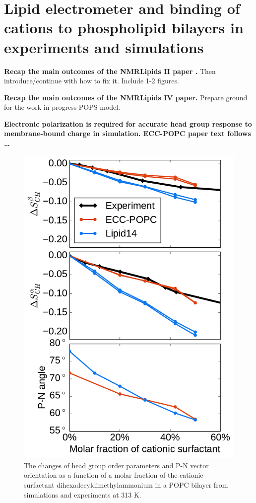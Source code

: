 \section{Lipid electrometer and binding of cations to phospholipid bilayers in experiments and simulations}
\label{section:electrometer_exp_sim} 

\textbf{ Recap the main outcomes of the NMRLipids II paper \citep{catte16}. }
Then introduce/continue with how to fix it. 
Include 1-2 figures. 

\textbf{ Recap the main outcomes of the NMRLipids IV paper. }
Prepare ground for the work-in-progress POPS model. 

\textbf{Electronic polarization is required for accurate head group response to membrane-bound charge in simulation. ECC-POPC paper text follows \dots  }

\begin{figure}[tb!] 
  \centering 
  \includegraphics[width=\figwidth]{../img/ecc_popc/PN_angle_OrdPars-A-B_L14-ECCL17_q80_sig89_surf.pdf} 
  \caption{\label{OrderParameterCHANGESsurf} 
    The changes of head group order parameters and P-N vector orientation as a function of 
    a molar fraction of the cationic surfactant dihexadecyldimethylammonium in a POPC bilayer 
    from simulations and experiments \citep{scherer89} at 313 K.
  } 
\end{figure} 
 
